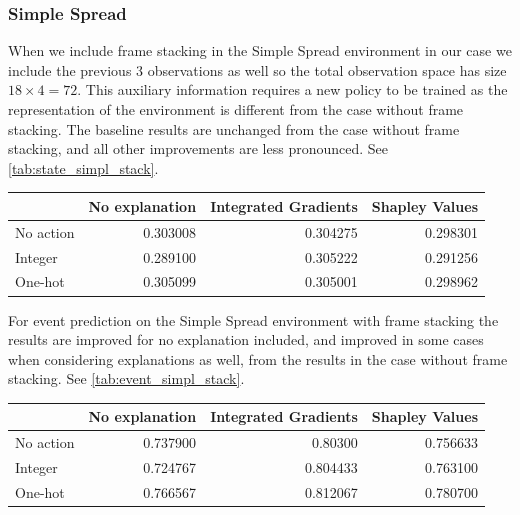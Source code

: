 \documentclass[UKenglish]{uiomasterthesis}
\begin{document}
\subsubsection{Simple Spread}
\label{sec:simpl_exp3}
When we include frame stacking in the Simple Spread environment in our case we include the previous 3 observations as well so the total observation space has size $18\times 4 = 72$. This auxiliary information requires a new policy to be trained as the representation of the environment is different from the case without frame stacking. The baseline results are unchanged from the case without frame stacking, and all other improvements are less pronounced. See \cref{tab:state_simpl_stack}.

\begin{center}
\label{tab:state_simpl_stack}
\begin{tabular}{lrrr}
\toprule
 & No explanation & Integrated Gradients & Shapley Values \\
\midrule
No action & 0.303008 & 0.304275 & 0.298301 \\
Integer & 0.289100 & 0.305222 & 0.291256 \\
One-hot & 0.305099 & 0.305001 & 0.298962 \\
\bottomrule
\end{tabular}
\end{center}

For event prediction on the Simple Spread environment with frame stacking the results are improved for no explanation included, and improved in some cases when considering explanations as well, from the results in the case without frame stacking. See \cref{tab:event_simpl_stack}.

\begin{center}
\label{tab:event_simpl_stack}
\begin{tabular}{lrrr}
\toprule
 & No explanation & Integrated Gradients & Shapley Values \\
\midrule
No action & 0.737900 & 0.80300 & 0.756633 \\
Integer & 0.724767 & 0.804433 & 0.763100 \\
One-hot & 0.766567 & 0.812067 & 0.780700 \\
\bottomrule
\end{tabular}
\end{center}
\end{document}
